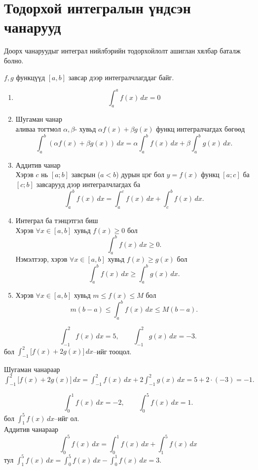 \section{Тодорхой интегралын үндсэн чанарууд}

Доорх чанаруудыг интеграл нийлбэрийн тодорхойлолт ашиглан хялбар баталж болно.

\begin{theorem}
 $f,g$ функцүүд $[a,b]$ завсар дээр интегралчлагддаг байг.
\begin{enumerate}
\item \[
\int_a^a f(x)\,dx
=0
\]
    \item Шугаман чанар\\
аливаа тогтмол $\alpha,\beta$- хувьд $\alpha f(x)+\beta g(x)$ функц интегралчагдах бөгөөд
\[
\int_a^b (\alpha f(x)+\beta g(x))\,dx
=
\alpha\int_a^b f(x)\,dx + \beta\int_a^b g(x)\,dx.
\]
\item Аддитив чанар\\
Хэрэв $c$ нь $[a;b]$  завсрын ($a<b$) дурын цэг бол $y=f(x)$ функц $[a;c]$ ба $[c;b]$ завсарууд дээр интегралчлагдах ба 
\[
\int_a^b f(x)\,dx
=
\int_a^c f(x)\,dx + \int_c^b f(x)\,dx.
\]
\item Интеграл ба тэнцэтгэл биш \\
Хэрэв  $\forall x\in[a,b]$ хувьд $f(x)\ge 0$ бол
\[
\int_a^b f(x)\,dx \ge 0.
\]
Нэмэлтээр, хэрэв $\forall x\in[a,b]$ хувьд $f(x)\ge g(x)$  бол
\[
\int_a^b f(x)\,dx \ge \int_a^b g(x)\,dx.
\]
\item 
Хэрэв $\forall x\in[a,b]$ хувьд $m\le f(x)\le M$  бол
\[
m(b-a) \le \int_a^b f(x)\,dx \le M(b-a).
\]
\end{enumerate}
\end{theorem}
\begin{example} \[
\int_{-1}^{2} f(x)\,dx = 5, 
\qquad 
\int_{-1}^{2} g(x)\,dx = -3.
\] бол
  $\displaystyle\int_{-1}^{2}\bigl[f(x)+2g(x)\bigr]\,dx$–ийг тооцол.

Шугаман чанараар 
 $\displaystyle\int_{-1}^{2}\bigl[f(x)+2g(x)\bigr]\,dx=\displaystyle\int_{-1}^{2}f(x)\,dx+2\displaystyle\int_{-1}^{2}g(x)\,dx=5+2\cdot (-3)=-1.$
\end{example}
\begin{example}
\[
\int_{0}^{1} f(x)\,dx = -2,  
\qquad 
\int_{0}^{5} f(x)\,dx =1.
\] бол $\displaystyle\int_{1}^{5} f(x)\,dx$–ийг ол.\\
Аддитив чанараар $$\displaystyle\int_{0}^{5} f(x)\,dx=\displaystyle\int_{0}^{1} f(x)\,dx+\displaystyle\int_{1}^{5} f(x)\,dx$$ тул $\displaystyle\int_{1}^{5} f(x)\,dx=\displaystyle\int_{0}^{5} f(x)\,dx-\displaystyle\int_{0}^{1} f(x)\,dx=3.$

\end{example}
